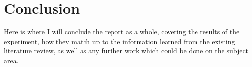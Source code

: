 \chapter{Conclusion}
\label{conclusion}

	Here is where I will conclude the report as a whole, covering the results of the experiment, how they match up to the information learned from the existing literature review, as well as any further work which could be done on the subject area.
